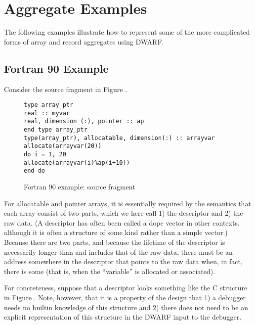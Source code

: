 \clearpage

\section{Aggregate Examples}
\label{app:aggregateexamples}

The following examples illustrate how to represent some of
the more complicated forms of array and record aggregates
using DWARF.

\subsection{Fortran 90 Example}
\label{app:fortran90example}
Consider the  source fragment in 
Figure .

\begin{figure}[here]
\begin{lstlisting}
type array_ptr
real :: myvar
real, dimension (:), pointer :: ap
end type array_ptr
type(array_ptr), allocatable, dimension(:) :: arrayvar
allocate(arrayvar(20))
do i = 1, 20
allocate(arrayvar(i)%ap(i+10))
end do
\end{lstlisting}
\caption{Fortran 90 example: source fragment} \label{fig:fortran90examplesourcefragment}
\end{figure}

For allocatable and pointer arrays, it is essentially required
by the  semantics that each array consist of 
two
parts, which we here call 1) the descriptor and 2) the raw
data. (A descriptor has often been called a dope vector in
other contexts, although it is often a structure of some kind
rather than a simple vector.) Because there are two parts,
and because the lifetime of the descriptor is necessarily
longer than and includes that of the raw data, there must be
an address somewhere in the descriptor that points to the
raw data when, in fact, there is some (that is, when 
the ``variable'' is allocated or associated).

For concreteness, suppose that a descriptor looks something
like the C structure in 
Figure .
Note, however, that it is
a property of the design that 1) a debugger needs no builtin
knowledge of this structure and 2) there does not need to
be an explicit representation of this structure in the DWARF
input to the 
debugger.


